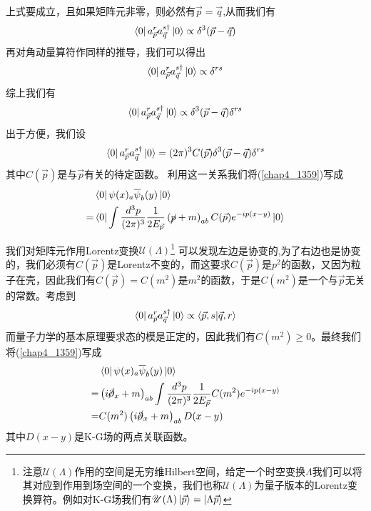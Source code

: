 上式要成立，且如果矩阵元非零，则必然有$\vec{p}=\vec{q}$,从而我们有
\begin{equation}
    \bra{0}a^{r}_{\vec{p}}a^{s\dagger}_{\vec{q}}\ket{0}\propto \delta^{3}(\vec{p}-\vec{q})
\end{equation}
再对角动量算符作同样的推导，我们可以得出
\begin{equation}
    \bra{0}a^{r}_{\vec{p}}a^{s\dagger}_{\vec{q}}\ket{0}\propto \delta^{rs}
\end{equation}
综上我们有
\begin{equation}
    \bra{0}a^{r}_{\vec{p}}a^{s\dagger}_{\vec{q}}\ket{0}\propto \delta^{3}(\vec{p}-\vec{q})\delta^{rs}
\end{equation}
出于方便，我们设
\begin{equation}
    \bra{0}a^{r}_{\vec{p}}a^{s\dagger}_{\vec{q}}\ket{0}=(2\pi)^{3} C(\vec{p})\delta^{3}(\vec{p}-\vec{q})\delta^{rs}
\end{equation}
其中$C(\vec{p})$是与$\vec{p}$有关的待定函数。
利用这一关系我们将(\ref{chap4_1359})写成
\begin{equation}
    \begin{aligned}
       &\bra{0}\psi(x)_{a}\overline{\psi}_{b}(y)\ket{0}\\
       =&\bra{0}\int \frac{d^{3}p}{(2\pi)^{3}}\frac{1}{{2E_{\vec{p}}}}\left(\cancel{p}+m\right)_{ab}C(\vec{p})e^{-ip(x-y)} \ket{0}\\
    \end{aligned}
\end{equation}

我们对矩阵元作用Lorentz变换$\mathscr{U}(\Lambda)$\footnote{注意$\mathscr{U}(\Lambda)$作用的空间是无穷维Hilbert空间，给定一个时空变换$\Lambda$我们可以将其对应到作用到场空间的一个变换，我们也称$\mathscr{U}(\Lambda)$为量子版本的Lorentz变换算符。例如对K-G场我们有$\mathscr{U}(\Lambda)\ket{\vec{p}}=\ket{\Lambda\vec{p}}$}
可以发现左边是协变的,为了右边也是协变的，我们必须有$C(\vec{p})$是Lorentz不变的，而这要求$C(\vec{p})$是$p^{2}$的函数，又因为粒子在壳，因此我们有$C(\vec{p})=C(m^{2})$是$m^{2}$的函数，于是$C(m^{2})$是一个与$\vec{p}$无关的常数。考虑到
\begin{equation}
    \bra{0}a^{r}_{\vec{p}}a^{s\dagger}_{\vec{q}}\ket{0} \propto \bra{\vec{p},s}\ket{\vec{q},r}
\end{equation}
而量子力学的基本原理要求态的模是正定的，因此我们有$C(m^{2})\geq0$。最终我们将(\ref{chap4_1359})写成
\begin{equation}
    \begin{aligned}
       &\bra{0}\psi(x)_{a}\overline{\psi}_{b}(y)\ket{0}\\
       =&\left(i\cancel{\partial}_{x}+m\right)_{ab}\int \frac{d^{3}p}{(2\pi)^{3}}\frac{1}{{2E_{\vec{p}}}}C(m^{2})e^{-ip(x-y)}\\
       =&C(m^{2})\left(i\cancel{\partial}_{x}+m\right)_{ab}D(x-y)
    \end{aligned}
\end{equation}
其中$D(x-y)$是K-G场的两点关联函数。

